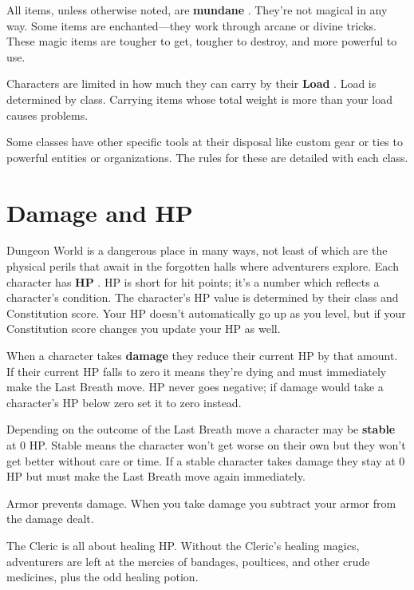 All items, unless otherwise noted, are {\bf mundane} . They're not magical in any way. Some items are enchanted—they work through arcane or divine tricks. These magic items are tougher to get, tougher to destroy, and more powerful to use.

       

Characters are limited in how much they can carry by their {\bf Load} . Load is determined by class. Carrying items whose total weight is more than your load causes problems.

       

Some classes have other specific tools at their disposal like custom gear or ties to powerful entities or organizations. The rules for these are detailed with each class.

       
\section{Damage and HP}    
       

Dungeon World is a dangerous place in many ways, not least of which are the physical perils that await in the forgotten halls where adventurers explore. Each character has {\bf HP} . HP is short for hit points; it's a number which reflects a character's condition. The character's HP value is determined by their class and Constitution score. Your HP doesn't automatically go up as you level, but if your Constitution score changes you update your HP as well.

       

When a character takes {\bf damage}  they reduce their current HP by that amount. If their current HP falls to zero it means they're dying and must immediately make the Last Breath move. HP never goes negative; if damage would take a character's HP below zero set it to zero instead.

       

Depending on the outcome of the Last Breath move a character may be {\bf stable}  at 0 HP. Stable means the character won't get worse on their own but they won't get better without care or time. If a stable character takes damage they stay at 0 HP but must make the Last Breath move again immediately.

       

Armor prevents damage. When you take damage you subtract your armor from the damage dealt.

       

The Cleric is all about healing HP. Without the Cleric's healing magics, adventurers are left at the mercies of bandages, poultices, and other crude medicines, plus the odd healing potion.

